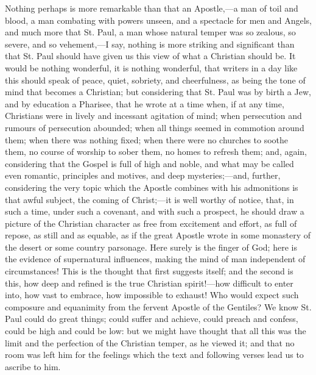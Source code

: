 Nothing perhaps is more remarkable than that an Apostle,—a man of
toil and blood, a man combating with powers unseen, and a spectacle
for men and Angels, and much more that St. Paul, a man whose natural
temper was so zealous, so severe, and so vehement,—I say, nothing is
more striking and significant than that St. Paul should have given us
this view of what a Christian should be. It would be nothing
wonderful, it is nothing wonderful, that writers in a day like this
should speak of peace, quiet, sobriety, and cheerfulness, as being the
tone of mind that becomes a Christian; but considering that St. Paul
was by birth a Jew, and by education a Pharisee, that he wrote at a
time when, if at any time, Christians were in lively and incessant
agitation of mind; when persecution and rumours of persecution
abounded; when all things seemed in commotion around them; when there
was nothing fixed; when there were no churches to soothe them, no
course of worship to sober them, no homes to refresh them; and, again,
considering that the Gospel is full of high and noble, and what may be
called even romantic, principles and motives, and deep mysteries;—and,
further, considering the very topic which the Apostle combines with
his admonitions is that awful subject, the coming of Christ;—it is
well worthy of notice, that, in such a time, under such a covenant,
and with such a prospect, he should draw a picture of the Christian
character as free from excitement and effort, as full of repose, as
still and as equable, as if the great Apostle wrote in some monastery
of the desert or some country parsonage. Here surely is the finger of
God; here is the evidence of supernatural influences, making the mind
of man independent of circumstances! This is the thought that first
suggests itself; and the second is this, how deep and refined is the
true Christian spirit!—how difficult to enter into, how vast to
embrace, how impossible to exhaust! Who would expect such composure
and equanimity from the fervent Apostle of the Gentiles? We know St.
Paul could do great things; could suffer and achieve, could preach and
confess, could be high and could be low: but we might have thought
that all this was the limit and the perfection of the Christian
temper, as he viewed it; and that no room was left him for the
feelings which the text and following verses lead us to ascribe to
him.

